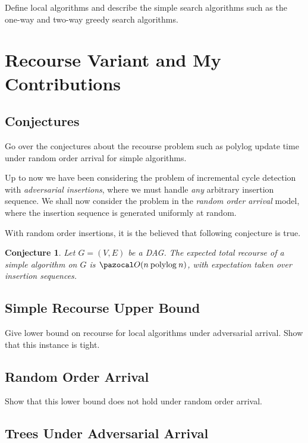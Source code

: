\documentclass{article}
\newtheorem{conjecture}[theorem]{Conjecture}
\begin{document}
Define local algorithms and describe the simple search algorithms such as the one-way and two-way greedy search algorithms.

\section{Recourse Variant and My Contributions}

\subsection{Conjectures}

Go over the conjectures about the recourse problem such as polylog update time under random order arrival for simple algorithms.

Up to now we have been considering the problem of incremental cycle detection with \textit{adversarial insertions}, where we must handle \textit{any} arbitrary insertion sequence. We shall now consider the problem in the \textit{random order arrival} model, where the insertion sequence is generated uniformly at random.

With random order insertions, it is the believed that following conjecture is true.

\begin{conjecture}
Let $G=(V,E)$ be a DAG. The expected total recourse of a simple algorithm on $G$ is $\pazocal O(n \: \mathrm{ polylog } \: n)$, with expectation taken over insertion sequences.
\end{conjecture}

\subsection{Simple Recourse Upper Bound}

Give lower bound on recourse for local algorithms under adversarial arrival. Show that this instance is tight.

\subsection{Random Order Arrival}

Show that this lower bound does not hold under random order arrival.

\subsection{Trees Under Adversarial Arrival}
\end{document}
